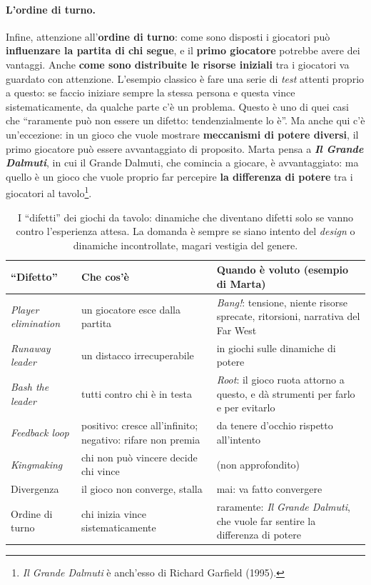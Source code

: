 \paragraph{L'ordine di turno.} Infine, attenzione all'\textbf{ordine di turno}: come sono
disposti i giocatori può \textbf{influenzare la partita di chi segue}, e il \textbf{primo
giocatore} potrebbe avere dei vantaggi. Anche \textbf{come sono distribuite le risorse
iniziali} tra i giocatori va guardato con attenzione. L'esempio classico è fare una serie di
\emph{test} attenti proprio a questo: se faccio iniziare sempre la stessa persona e questa
vince sistematicamente, da qualche parte c'è un problema. Questo è uno di quei casi che
``raramente può non essere un difetto: tendenzialmente lo è''. Ma anche qui c'è un'eccezione:
in un gioco che vuole mostrare \textbf{meccanismi di potere diversi}, il primo giocatore può
essere avvantaggiato di proposito. Marta pensa a \textbf{\emph{Il Grande Dalmuti}}, in cui il
Grande Dalmuti, che comincia a giocare, è avvantaggiato: ma quello è un gioco che vuole proprio
far percepire \textbf{la differenza di potere} tra i giocatori al tavolo\footnote{\emph{Il Grande
Dalmuti} è anch'esso di Richard Garfield (1995).}.

\begin{table}[htbp]
\centering
\small
\begin{tabular}{@{}p{3.0cm}p{4.8cm}p{5.6cm}@{}}
\toprule
\textbf{``Difetto''} & \textbf{Che cos'è} & \textbf{Quando è voluto (esempio di Marta)} \\
\midrule
\emph{Player elimination} & un giocatore esce dalla partita & \emph{Bang!}: tensione, niente
  risorse sprecate, ritorsioni, narrativa del Far West \\
\addlinespace
\emph{Runaway leader} & un distacco irrecuperabile & in giochi sulle dinamiche di potere \\
\addlinespace
\emph{Bash the leader} & tutti contro chi è in testa & \emph{Root}: il gioco ruota attorno a
  questo, e dà strumenti per farlo e per evitarlo \\
\addlinespace
\emph{Feedback loop} & positivo: cresce all'infinito; negativo: rifare non premia & da tenere
  d'occhio rispetto all'intento \\
\addlinespace
\emph{Kingmaking} & chi non può vincere decide chi vince & (non approfondito) \\
\addlinespace
Divergenza & il gioco non converge, stalla & mai: va fatto convergere \\
\addlinespace
Ordine di turno & chi inizia vince sistematicamente & raramente: \emph{Il Grande Dalmuti}, che
  vuole far sentire la differenza di potere \\
\bottomrule
\end{tabular}
\caption{I ``difetti'' dei giochi da tavolo: dinamiche che diventano difetti solo se vanno
contro l'esperienza attesa. La domanda è sempre se siano intento del \emph{design} o dinamiche
incontrollate, magari vestigia del genere.}
\label{a14:tab:difetti}
\end{table}

